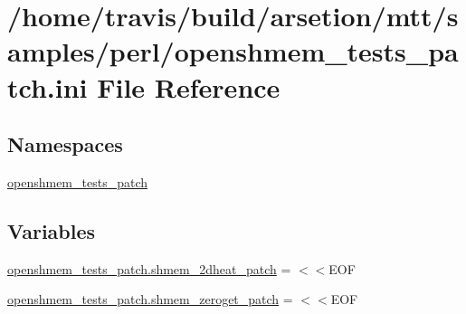 \hypertarget{openshmem__tests__patch_8ini}{\section{/home/travis/build/arsetion/mtt/samples/perl/openshmem\-\_\-tests\-\_\-patch.ini File Reference}
\label{openshmem__tests__patch_8ini}
}
\subsection*{Namespaces}
\begin{DoxyCompactItemize}
\item 
\hyperlink{namespaceopenshmem__tests__patch}{openshmem\-\_\-tests\-\_\-patch}
\end{DoxyCompactItemize}
\subsection*{Variables}
\begin{DoxyCompactItemize}
\item 
\hyperlink{namespaceopenshmem__tests__patch_a391991e1010e023b4787fba54765e3b1}{openshmem\-\_\-tests\-\_\-patch.\-shmem\-\_\-2dheat\-\_\-patch} = $<$$<$E\-O\-F
\item 
\hyperlink{namespaceopenshmem__tests__patch_a3aaaf9e5a26acd1ddc1ed38bee8c1366}{openshmem\-\_\-tests\-\_\-patch.\-shmem\-\_\-zeroget\-\_\-patch} = $<$$<$E\-O\-F
\end{DoxyCompactItemize}
